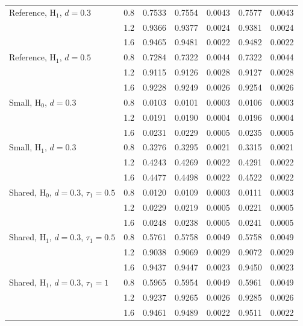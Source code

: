 \begin{table}[htbp]
\begin{tabular}{lrrrrrr}
Reference, $\mathrm{H}_1$, $d = 0.3$ & 0.8 & 0.7533 & 0.7554 & 0.0043 & 0.7577 & 0.0043 \\
 & 1.2 & 0.9366 & 0.9377 & 0.0024 & 0.9381 & 0.0024 \\
 & 1.6 & 0.9465 & 0.9481 & 0.0022 & 0.9482 & 0.0022 \\
Reference, $\mathrm{H}_1$, $d = 0.5$ & 0.8 & 0.7284 & 0.7322 & 0.0044 & 0.7322 & 0.0044 \\
 & 1.2 & 0.9115 & 0.9126 & 0.0028 & 0.9127 & 0.0028 \\
 & 1.6 & 0.9228 & 0.9249 & 0.0026 & 0.9254 & 0.0026 \\
Small, $\mathrm{H}_0$, $d = 0.3$ & 0.8 & 0.0103 & 0.0101 & 0.0003 & 0.0106 & 0.0003 \\
 & 1.2 & 0.0191 & 0.0190 & 0.0004 & 0.0196 & 0.0004 \\
 & 1.6 & 0.0231 & 0.0229 & 0.0005 & 0.0235 & 0.0005 \\
Small, $\mathrm{H}_1$, $d = 0.3$ & 0.8 & 0.3276 & 0.3295 & 0.0021 & 0.3315 & 0.0021 \\
 & 1.2 & 0.4243 & 0.4269 & 0.0022 & 0.4291 & 0.0022 \\
 & 1.6 & 0.4477 & 0.4498 & 0.0022 & 0.4522 & 0.0022 \\
Shared, $\mathrm{H}_0$, $d = 0.3$, $\tau_1 = 0.5$ & 0.8 & 0.0120 & 0.0109 & 0.0003 & 0.0111 & 0.0003 \\
 & 1.2 & 0.0229 & 0.0219 & 0.0005 & 0.0221 & 0.0005 \\
 & 1.6 & 0.0248 & 0.0238 & 0.0005 & 0.0241 & 0.0005 \\
Shared, $\mathrm{H}_1$, $d = 0.3$, $\tau_1 = 0.5$ & 0.8 & 0.5761 & 0.5758 & 0.0049 & 0.5758 & 0.0049 \\
 & 1.2 & 0.9038 & 0.9069 & 0.0029 & 0.9072 & 0.0029 \\
 & 1.6 & 0.9437 & 0.9447 & 0.0023 & 0.9450 & 0.0023 \\
Shared, $\mathrm{H}_1$, $d = 0.3$, $\tau_1 = 1$ & 0.8 & 0.5965 & 0.5954 & 0.0049 & 0.5961 & 0.0049 \\
 & 1.2 & 0.9237 & 0.9265 & 0.0026 & 0.9285 & 0.0026 \\
 & 1.6 & 0.9461 & 0.9489 & 0.0022 & 0.9511 & 0.0022 \\
\hline
\end{tabular}
\end{table}

